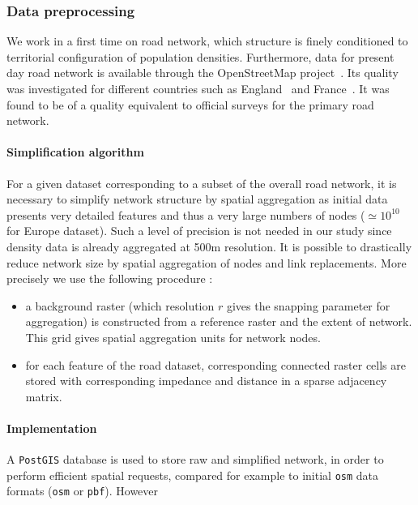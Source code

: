\subsubsection{Data preprocessing}

We work in a first time on road network, which structure is finely conditioned to territorial configuration of population densities. Furthermore, data for present day road network is available through the OpenStreetMap project~\cite{openstreetmap}. Its quality was investigated for different countries such as England~\cite{haklay2010good} and France~\cite{girres2010quality}. It was found to be of a quality equivalent to official surveys for the primary road network.



\paragraph{Simplification algorithm}

For a given dataset corresponding to a subset of the overall road network, it is necessary to simplify network structure by spatial aggregation as initial data presents very detailed features and thus a very large numbers of nodes ($\simeq 10^10$ for Europe dataset). Such a level of precision is not needed in our study since density data is already aggregated at 500m resolution. It is possible to drastically reduce network size by spatial aggregation of nodes and link replacements. More precisely we use the following procedure :
\begin{itemize}
\item a background raster (which resolution $r$ gives the snapping parameter for aggregation) is constructed from a reference raster and the extent of network. This grid gives spatial aggregation units for network nodes.
\item for each feature of the road dataset, corresponding connected raster cells are stored with corresponding impedance and distance in a sparse adjacency matrix.
\end{itemize}


\paragraph{Implementation}

A \texttt{PostGIS} database is used to store raw and simplified network, in order to perform efficient spatial requests, compared for example to initial \texttt{osm} data formats (\texttt{osm} or \texttt{pbf}). However


